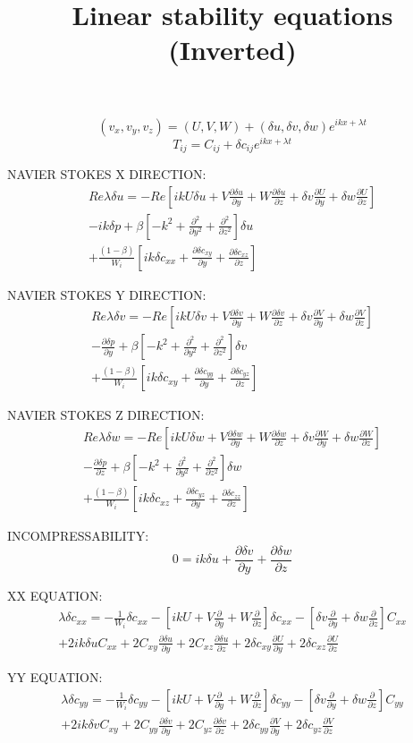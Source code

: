 \documentclass[12,a4paper]{article}
\newcommand{\dy}[1]{\frac{\partial #1}{\partial y}}
\newcommand{\dz}[1]{\frac{\partial #1}{\partial z}}
\newcommand{\scxx}{\delta c_{xx}}
\newcommand{\scyy}{\delta c_{yy}}
\newcommand{\sczz}{\delta c_{zz}}
\newcommand{\scxy}{\delta c_{xy}}
\newcommand{\scxz}{\delta c_{xz}}
\newcommand{\scyz}{\delta c_{yz}}
\newcommand{\su}{\delta u}
\newcommand{\sv}{\delta v}
\newcommand{\sw}{\delta w}
\newcommand{\spr}{\delta p}
\newcommand{\Wi}{\frac{1}{W_{i}}}
\newcommand{\first}[2]{-\Wi \delta c_{#1 #2} - \left[ ikU
+ V\frac{\partial}{\partial y} + W\frac{\partial}{\partial z} \right] \delta c_{#1 #2} 
- \left[ \sv\frac{\partial }{\partial y} + \sw\frac{\partial }{\partial z} \right] C_{#1 #2}}
\newcommand{\laplacian}{\left[-k^{2} + \frac{\partial^{2}}{\partial y^{2}} + \frac{\partial^{2}}{\partial z^{2}}\right]}
\begin{document}
\title{Linear stability equations (Inverted)}
\maketitle

\begin{equation}
 (v_{x}, v_{y}, v_{z}) = (U,V,W) + (\su, \sv, \sw)e^{ikx + \lambda t}
\end{equation}
\begin{equation}
T_{ij} = C_{ij} + \delta c_{ij} e^{ikx + \lambda t}
\end{equation}

NAVIER STOKES X DIRECTION:
\begin{multline}
 Re \lambda \su = -Re \left[ ikU \su + V \dy{\su} + W\dz{\su} + \sv \dy{U} +\sw \dz{U} \right]\\
 - ik\spr + \beta \laplacian \su \\
 + \frac{(1-\beta)}{W_{i}}\left[ ik\scxx + \dy{\scxy} + \dz{\scxz} \right]  
\end{multline}

NAVIER STOKES Y DIRECTION:
\begin{multline}
Re \lambda \sv = -Re \left[ ikU \sv + V \dy{\sv} + W\dz{\sv} + \sv \dy{V} +\sw \dz{V} \right]\\
 - \dy{\spr} + \beta \laplacian \sv \\
 + \frac{(1-\beta)}{W_{i}}\left[ ik \scxy + \dy{\scyy} + \dz{\scyz} \right]
\end{multline}

NAVIER STOKES Z DIRECTION:
\begin{multline}
 Re \lambda \sw = -Re \left[ ikU \sw + V \dy{\sw} + W\dz{\sw} + \sv \dy{W} +\sw \dz{W} \right]\\
 - \dz{\spr} + \beta \laplacian \sw \\
 + \frac{(1-\beta)}{W_{i}}\left[ ik \scxz + \dy{\scyz} + \dz{\sczz} \right]
\end{multline}

INCOMPRESSABILITY:
\begin{equation}
 0 = ik\su + \dy{\sv} + \dz{\sw}
\end{equation}

XX EQUATION:
\begin{multline}
  \lambda \delta c_{xx}  = \first{x}{x} \\
+ 2ik\su C_{xx} + 2C_{xy} \dy{\su} + 2C_{xz} \dz{\su} + 2\scxy \dy{U} + 2\scxz \dz{U}
\end{multline}

YY EQUATION:
\begin{multline}
 \lambda \delta c_{yy} = \first{y}{y} \\
+ 2ik\sv C_{xy} + 2C_{yy}\dy{\sv} + 2C_{yz}\dz{\sv} + 2\scyy \dy{V} + 2\scyz \dz{V}\\
\end{multline}
\end{document}
